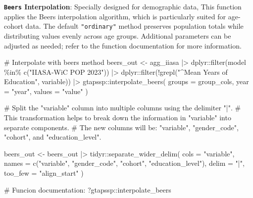 \documentclass[
  letterpaper,
  DIV=11,
  numbers=noendperiod]{scrartcl}
\newenvironment{Shaded}{}{}
\newcommand{\AttributeTok}[1]{\textcolor[rgb]{0.00,0.34,0.68}{#1}}
\newcommand{\CommentTok}[1]{\textcolor[rgb]{0.54,0.53,0.53}{#1}}
\newcommand{\FunctionTok}[1]{\textcolor[rgb]{0.39,0.29,0.61}{#1}}
\newcommand{\NormalTok}[1]{\textcolor[rgb]{0.12,0.11,0.11}{#1}}
\newcommand{\OtherTok}[1]{\textcolor[rgb]{0.00,0.43,0.16}{#1}}
\newcommand{\SpecialCharTok}[1]{\textcolor[rgb]{0.24,0.68,0.91}{#1}}
\newcommand{\StringTok}[1]{\textcolor[rgb]{0.75,0.01,0.01}{#1}}
\begin{document}
\textbf{\texttt{Beers} Interpolation}: Specially designed for
demographic data, This function applies the Beers interpolation
algorithm, which is particularly suited for age-cohort data. The default
\texttt{"ordinary"} method preserves population totals while
distributing values evenly across age groups. Additional parameters can
be adjusted as needed; refer to the function documentation for more
information.

\begin{Shaded}
\begin{Highlighting}[]
\CommentTok{\# Interpolate with beers method}
\NormalTok{beers\_out }\OtherTok{\textless{}{-}}\NormalTok{ agg\_iiasa }\SpecialCharTok{|\textgreater{}}
\NormalTok{  dplyr}\SpecialCharTok{::}\FunctionTok{filter}\NormalTok{(model }\SpecialCharTok{\%in\%} \FunctionTok{c}\NormalTok{(}\StringTok{"IIASA{-}WiC POP 2023"}\NormalTok{)) }\SpecialCharTok{|\textgreater{}}
\NormalTok{  dplyr}\SpecialCharTok{::}\FunctionTok{filter}\NormalTok{(}\SpecialCharTok{!}\FunctionTok{grepl}\NormalTok{(}\StringTok{"\^{}Mean Years of Education"}\NormalTok{, variable)) }\SpecialCharTok{|\textgreater{}}
\NormalTok{  gtapssp}\SpecialCharTok{::}\FunctionTok{interpolate\_beers}\NormalTok{(}
    \AttributeTok{groups =}\NormalTok{ group\_cols,}
    \AttributeTok{year =} \StringTok{"year"}\NormalTok{,}
    \AttributeTok{values =} \StringTok{"value"}
\NormalTok{  )}

\CommentTok{\# Split the "variable" column into multiple columns using the delimiter "|".}
\CommentTok{\# This transformation helps to break down the information in "variable" into separate components.}
\CommentTok{\# The new columns will be: "variable", "gender\_code", "cohort", and "education\_level".}

\NormalTok{beers\_out }\OtherTok{\textless{}{-}}\NormalTok{ beers\_out }\SpecialCharTok{|\textgreater{}}
\NormalTok{  tidyr}\SpecialCharTok{::}\FunctionTok{separate\_wider\_delim}\NormalTok{(}
    \AttributeTok{cols =} \StringTok{"variable"}\NormalTok{, }\hspace*{\fill}\NormalTok{}
    \AttributeTok{names =} \FunctionTok{c}\NormalTok{(}\StringTok{"variable"}\NormalTok{, }\StringTok{"gender\_code"}\NormalTok{, }\StringTok{"cohort"}\NormalTok{, }\StringTok{"education\_level"}\NormalTok{), }\hspace*{\fill}\NormalTok{}
    \AttributeTok{delim =} \StringTok{"|"}\NormalTok{, }\hspace*{\fill}\NormalTok{}
    \AttributeTok{too\_few =} \StringTok{"align\_start"} \hspace*{\fill}\NormalTok{}
\NormalTok{  )}

\CommentTok{\# Funcion documentation:}
\NormalTok{?gtapssp}\SpecialCharTok{::}\NormalTok{interpolate\_beers}
\end{Highlighting}
\end{Shaded}
\end{document}
